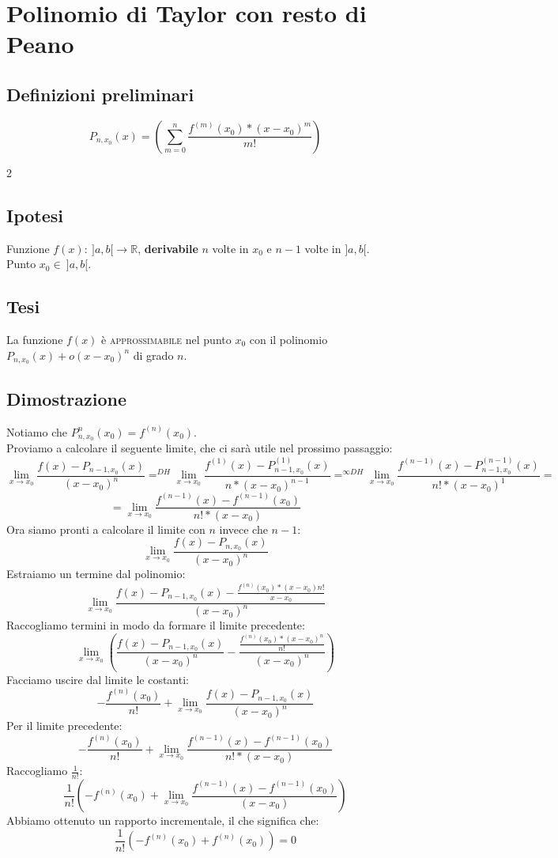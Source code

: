 \documentclass{article}
\begin{document}
\newpage

\section{Polinomio di Taylor con resto di Peano}

\subsection{Definizioni preliminari}
\[P_{n, x_0}(x) = (\sum^{n}_{m = 0} \frac{f^{(m)}(x_0) * (x - x_0)^m}{m!})\]

\begin{multicols}{2}
    \subsection{Ipotesi}
    Funzione \(f(x) :\ ]a, b[ \to \mathbb{R}\), \textbf{derivabile} \(n\) volte in \(x_0\) e \(n - 1\) volte in \(]a, b[\).\\
    Punto \(x_0 \in\ ]a, b[\).
\columnbreak
    \subsection{Tesi}
    La funzione \(f(x)\) è \textsc{approssimabile} nel punto \(x_0\) con il polinomio \(P_{n, x_0}(x) + o(x - x_0)^n\) di grado \(n\).
\end{multicols}

\subsection{Dimostrazione}

Notiamo che \(P^{n}_{n, x_0}(x_0) = f^{(n)}(x_0)\).\\
Proviamo a calcolare il seguente limite, che ci sarà utile nel prossimo passaggio:
\[\lim_{x \to x_0} \frac{f(x) - P_{n - 1, x_0}(x)}{(x - x_0)^n} =^{DH} \lim_{x \to x_0} \frac{f^{(1)}(x) - P^{(1)}_{n - 1, x_0}(x)}{n * (x - x_0)^{n - 1}} =^{\infty DH} \lim_{x \to x_0} \frac{f^{(n - 1)}(x) - P^{(n - 1)}_{n - 1, x_0}(x)}{n! * (x - x_0)^{1}} =\]
\[= \lim_{x \to x_0} \frac{f^{(n - 1)}(x) - f^{(n - 1)}(x_0)}{n! * (x - x_0)}\]
Ora siamo pronti a calcolare il limite con \(n\) invece che \(n - 1\):
\[\lim_{x \to x_0} \frac{f(x) - P_{n, x_0}(x)}{(x - x_0)^n}\]
Estraiamo un termine dal polinomio:
\[\lim_{x \to x_0} \frac{f(x) - P_{n - 1, x_0}(x) - \frac{f^{(n)}(x_0) * (x - x_0){n!}}{x - x_0}}{(x - x_0)^n}\]
Raccogliamo termini in modo da formare il limite precedente:
\[\lim_{x \to x_0} ( \frac{f(x) - P_{n - 1, x_0}(x)}{(x - x_0)^n} - \frac{\frac{f^{(n)}(x_0) * (x - x_0)^n}{n!}}{(x - x_0)^n} ) \]
Facciamo uscire dal limite le costanti:
\[- \frac{f^{(n)}(x_0)}{n!} + \lim_{x \to x_0} \frac{f(x) - P_{n - 1, x_0}(x)}{(x - x_0)^n}\]
Per il limite precedente:
\[- \frac{f^{(n)}(x_0)}{n!} + \lim_{x \to x_0} \frac{f^{(n - 1)}(x) - f^{(n - 1)}(x_0)}{n! * (x - x_0)}\]
Raccogliamo \(\frac{1}{n!}\):
\[\frac{1}{n!} (- f^{(n)}(x_0) + \lim_{x \to x_0} \frac{f^{(n - 1)}(x) - f^{(n - 1)}(x_0)}{(x - x_0)})\]
Abbiamo ottenuto un rapporto incrementale, il che significa che:
\[\frac{1}{n!} (- f^{(n)}(x_0) + f^{(n)}(x_0)) = 0\]
\end{document}
